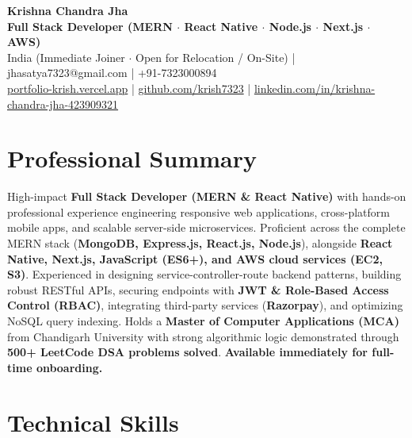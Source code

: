 \documentclass[a4paper,10pt]{article}
\begin{document}
\begin{center}

    {\LARGE \textbf{Krishna Chandra Jha}} \\[2.5pt]

    \textbf{Full Stack Developer (MERN $\cdot$ React Native $\cdot$ Node.js $\cdot$ Next.js $\cdot$ AWS)} \\[3.5pt]

    India (Immediate Joiner $\cdot$ Open for Relocation / On-Site)
    \quad | \quad
    jhasatya7323@gmail.com
    \quad | \quad
    +91-7323000894
    \\[2.5pt]

    \href{https://portfolio-ashen-alpha-dv0whhsamo.vercel.app/}{portfolio-krish.vercel.app}
    \quad | \quad
    \href{https://github.com/krish7323}{github.com/krish7323}
    \quad | \quad
    \href{https://linkedin.com/in/krishna-chandra-jha-423909321}
    {linkedin.com/in/krishna-chandra-jha-423909321}

\end{center}

\section*{Professional Summary}

High-impact \textbf{Full Stack Developer (MERN \& React Native)} with hands-on professional experience engineering responsive web applications, cross-platform mobile apps, and scalable server-side microservices. Proficient across the complete MERN stack (\textbf{MongoDB, Express.js, React.js, Node.js}), alongside \textbf{React Native, Next.js, JavaScript (ES6+), and AWS cloud services (EC2, S3)}. Experienced in designing service-controller-route backend patterns, building robust RESTful APIs, securing endpoints with \textbf{JWT \& Role-Based Access Control (RBAC)}, integrating third-party services (\textbf{Razorpay}), and optimizing NoSQL query indexing. Holds a \textbf{Master of Computer Applications (MCA)} from Chandigarh University with strong algorithmic logic demonstrated through \textbf{500+ LeetCode DSA problems solved}. \textbf{Available immediately for full-time onboarding.}

\section*{Technical Skills}
\end{document}
